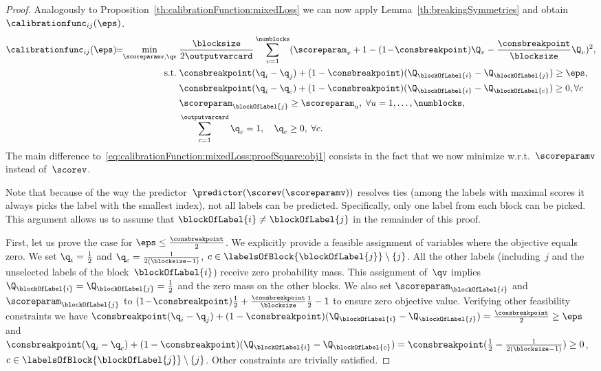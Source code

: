 \documentclass{article}
\begin{document}
\begin{proof}
    Analogously to Proposition~\ref{th:calibrationFunction:mixedLoss} we can now apply Lemma~\ref{th:breakingSymmetries} and obtain $\calibrationfunc_{ij}(\eps)$.
    \begin{align}
    \label{eq:calibrationFunction:mixedLoss:hardConstr:proofSquare:obj1}
    \calibrationfunc_{ij}(\eps) \!\!=\!\! \min_{\scoreparamv, \qv} \; & \frac{\blocksize}{2\outputvarcard} \sum_{v=1}^\numblocks (\scoreparam_v + 1 - (1\!-\!\consbreakpoint) \Q_v - \frac{\consbreakpoint}{\blocksize} \Q_v)^2, \\
    \notag \mbox{s.t.} \;& \consbreakpoint (\q_i - \q_j) + (1-\consbreakpoint)(\Q_{\blockOfLabel{i}} - \Q_{\blockOfLabel{j}}) \geq \eps, \\
    \notag & \consbreakpoint (\q_i - \q_c) + (1-\consbreakpoint)(\Q_{\blockOfLabel{i}} - \Q_{\blockOfLabel{c}}) \geq 0, \forall c \\
    \notag & \scoreparam_{\blockOfLabel{j}} \geq \scoreparam_u, \; \forall u = 1,\dots,\numblocks, \\
    \notag & \sum_{c=1}^\outputvarcard \q_c = 1, \quad \q_c \geq 0, \; \forall c.
    \end{align}
    The main difference to~\eqref{eq:calibrationFunction:mixedLoss:proofSquare:obj1} consists in the fact that we now minimize w.r.t.\ $\scoreparamv$ instead of~$\scorev$.
    
    Note that because of the way the predictor~$\predictor(\scorev(\scoreparamv))$ resolves ties (among the labels with maximal scores it always picks the label with the smallest index), not all labels can be predicted.
    Specifically, only one label from each block can be picked.
    This argument allows us to assume that $\blockOfLabel{i} \neq \blockOfLabel{j}$ in the remainder of this proof.
    
    First, let us prove the case for $\eps \leq \frac{\consbreakpoint}{2}$.
    We explicitly provide a feasible assignment of variables where the objective equals zero.
    We set $\q_i = \frac12$ and $\q_c = \frac{1}{2(\blocksize-1)}$, $c \in \labelsOfBlock{\blockOfLabel{j}} \setminus \{j\}$.
    All the other labels (including~$j$ and the unselected labels of the block~$\blockOfLabel{i}$) receive zero probability mass.
    This assignment of~$\qv$ implies~$\Q_{\blockOfLabel{i}} = \Q_{\blockOfLabel{j}} = \frac12$ and the zero mass on the other blocks.
    We also set $\scoreparam_{\blockOfLabel{i}}$ and $\scoreparam_{\blockOfLabel{j}}$ to $(1\!-\!\consbreakpoint) \frac12 + \frac{\consbreakpoint}{\blocksize} \frac12 - 1$ to ensure zero objective value.
    Verifying other feasibility constraints we have 
    $\consbreakpoint (\q_i - \q_j) + (1-\consbreakpoint)(\Q_{\blockOfLabel{i}} - \Q_{\blockOfLabel{j}}) = \frac{\consbreakpoint}{2} \geq \eps$ and $\consbreakpoint (\q_i - \q_c) + (1-\consbreakpoint)(\Q_{\blockOfLabel{i}} - \Q_{\blockOfLabel{c}}) = \consbreakpoint(\frac12-\frac{1}{2(\blocksize-1)}) \geq 0$, $c \in \labelsOfBlock{\blockOfLabel{j}} \setminus \{j\}$.
    Other constraints are trivially satisfied.
    

\end{proof}
\end{document}
